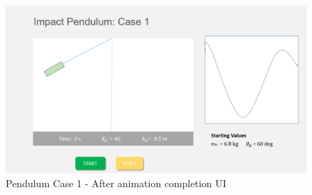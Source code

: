\documentclass[onecolumn, draftclsnofoot,10pt, compsoc]{IEEEtran}
\begin{document}
\begin{figure}[H]
  \includegraphics[width=5.5 in]{pendulum_case_1_2.png}
  \caption{Pendulum Case 1 - After animation completion UI}
  \label{fig:case1_end}
\end{figure}
\end{document}
